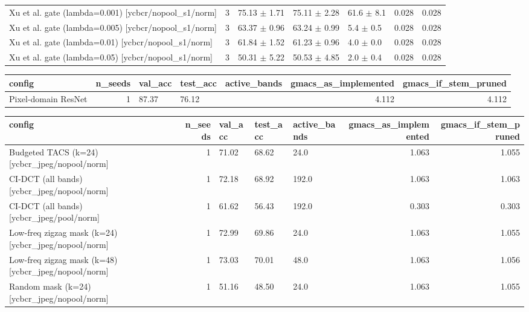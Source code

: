\begin{tabular}{lrlllrr}
Xu et al. gate (lambda=0.001) [ycbcr/nopool_s1/norm] & 3 & 75.13 $\pm$ 1.71 & 75.11 $\pm$ 2.28 & 61.6 $\pm$ 8.1 & 0.028 & 0.028 \\
Xu et al. gate (lambda=0.005) [ycbcr/nopool_s1/norm] & 3 & 63.37 $\pm$ 0.96 & 63.24 $\pm$ 0.99 & 5.4 $\pm$ 0.5 & 0.028 & 0.028 \\
Xu et al. gate (lambda=0.01) [ycbcr/nopool_s1/norm] & 3 & 61.84 $\pm$ 1.52 & 61.23 $\pm$ 0.96 & 4.0 $\pm$ 0.0 & 0.028 & 0.028 \\
Xu et al. gate (lambda=0.05) [ycbcr/nopool_s1/norm] & 3 & 50.31 $\pm$ 5.22 & 50.53 $\pm$ 4.85 & 2.0 $\pm$ 0.4 & 0.028 & 0.028 \\
\bottomrule
\end{tabular}

\begin{tabular}{lrlllrr}
\toprule
config & n_seeds & val_acc & test_acc & active_bands & gmacs_as_implemented & gmacs_if_stem_pruned \\
\midrule
Pixel-domain ResNet & 1 & 87.37 & 76.12 &  & 4.112 & 4.112 \\
\bottomrule
\end{tabular}

\begin{tabular}{lrlllrr}
\toprule
config & n_seeds & val_acc & test_acc & active_bands & gmacs_as_implemented & gmacs_if_stem_pruned \\
\midrule
Budgeted TACS (k=24) [ycbcr_jpeg/nopool/norm] & 1 & 71.02 & 68.62 & 24.0 & 1.063 & 1.055 \\
CI-DCT (all bands) [ycbcr_jpeg/nopool/norm] & 1 & 72.18 & 68.92 & 192.0 & 1.063 & 1.063 \\
CI-DCT (all bands) [ycbcr_jpeg/pool/norm] & 1 & 61.62 & 56.43 & 192.0 & 0.303 & 0.303 \\
Low-freq zigzag mask (k=24) [ycbcr_jpeg/nopool/norm] & 1 & 72.99 & 69.86 & 24.0 & 1.063 & 1.055 \\
Low-freq zigzag mask (k=48) [ycbcr_jpeg/nopool/norm] & 1 & 73.03 & 70.01 & 48.0 & 1.063 & 1.056 \\
Random mask (k=24) [ycbcr_jpeg/nopool/norm] & 1 & 51.16 & 48.50 & 24.0 & 1.063 & 1.055 \\
\bottomrule
\end{tabular}

